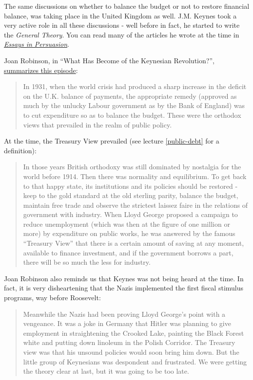 \documentclass[]{book}
\begin{document}
The same discussions on whether to balance the budget or not to restore
financial balance, was taking place in the United Kingdom as well. J.M.
Keynes took a very active role in all these discussions - well before in
fact, he started to write the \emph{General Theory}. You can read many
of the articles he wrote at the time in
\href{https://en.wikisource.org/wiki/Essays_in_Persuasion}{\emph{Essays
in Persuasion}}.

Joan Robinson, in ``What Has Become of the Keynesian Revolution?'',
\href{bib/Robinson1974.pdf}{summarizes this episode}:

\begin{quote}
In 1931, when the world crisis had produced a sharp increase in the
deficit on the U.K. balance of payments, the appropriate remedy
(approved as much by the unlucky Labour government as by the Bank of
England) was to cut expenditure so as to balance the budget. These were
the orthodox views that prevailed in the realm of public policy.
\end{quote}

At the time, the Treasury View prevailed (see lecture \ref{public-debt}
for a definition):

\begin{quote}
In those years British orthodoxy was still dominated by nostalgia for
the world before 1914. Then there was normality and equilibrium. To get
back to that happy state, its institutions and its policies should be
restored - keep to the gold standard at the old sterling parity, balance
the budget, maintain free trade and observe the strictest laissez faire
in the relations of government with industry. When Lloyd George proposed
a campaign to reduce unemployment (which was then at the figure of one
million or more) by expenditure on public works, he was answered by the
famous ``Treasury View'' that there is a certain amount of saving at any
moment, available to finance investment, and if the government borrows a
part, there will be so much the less for industry.
\end{quote}

Joan Robinson also reminds us that Keynes was not being heard at the
time. In fact, it is very disheartening that the Nazis implemented the
first fiscal stimulus programs, way before Roosevelt:

\begin{quote}
Meanwhile the Nazis had been proving Lloyd George's point with a
vengeance. It was a joke in Germany that Hitler was planning to give
employment in straightening the Crooked Lake, painting the Black Forest
white and putting down linoleum in the Polish Corridor. The Treasury
view was that his unsound policies would soon bring him down. But the
little group of Keynesians was despondent and frustrated. We were
getting the theory clear at last, but it was going to be too late.
\end{quote}
\end{document}
